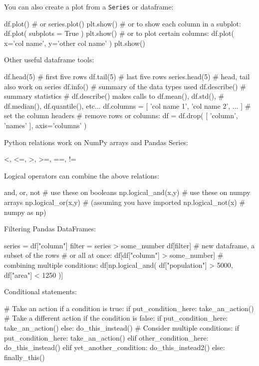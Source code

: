 \documentclass[a4paper,landscape,columns=3]{cheatsheet}
\begin{document}
You can also create a plot from a \lstinline{Series} or dataframe:
\begin{python}
df.plot()            # or series.plot()
plt.show()
# or to show each column in a subplot:
df.plot( subplots = True )
plt.show()
# or to plot certain columns:
df.plot( x='col name', y='other col name' )
plt.show()
\end{python}

Other useful dataframe tools:
\begin{python}
df.head(5)           # first five rows
df.tail(5)           # last five rows
series.head(5)       # head, tail also work on series
df.info()            # summary of the data types used
df.describe()        # summary statistics
# df.describe() makes calls to df.mean(), df.std(),
# df.median(), df.quantile(), etc...
df.columns = [ 'col name 1', 'col name 2', ... ]
                     # set the column headers
# remove rows or columns:
df = df.drop( [ 'column', 'names' ], axis='columns' )
\end{python}

Python relations work on NumPy arrays and Pandas Series:
\begin{python}
<, <=, >, >=, ==, !=
\end{python}

Logical operators can combine the above relations:
\begin{python}
and, or, not          # use these on booleans
np.logical_and(x,y)   # use these on numpy arrays
np.logical_or(x,y)    # (assuming you have imported
np.logical_not(x)     # numpy as np)
\end{python}

Filtering Pandas DataFrames:
\begin{python}
series = df["column"]
filter = series > some_number
df[filter]  # new dataframe, a subset of the rows
# or all at once:
df[df["column"] > some_number]
# combining multiple conditions:
df[np.logical_and( df["population"] > 5000,
                   df["area"] < 1250 )]
\end{python}

Conditional statements:
\begin{python}
# Take an action if a condition is true:
if put_condition_here:
    take_an_action()
# Take a different action if the condition is false:
if put_condition_here:
    take_an_action()
else:
    do_this_instead()
# Consider multiple conditions:
if put_condition_here:
    take_an_action()
elif other_condition_here:
    do_this_instead()
elif yet_another_condition:
    do_this_instead2()
else:
    finally_this()
\end{python}
\end{document}

